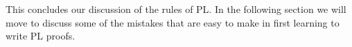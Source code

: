 This concludes our discussion of the rules of PL.
In the following section we will move to discuss some of the mistakes that are easy to make in first learning to write PL proofs.



%
%
%
%
%
%
%
